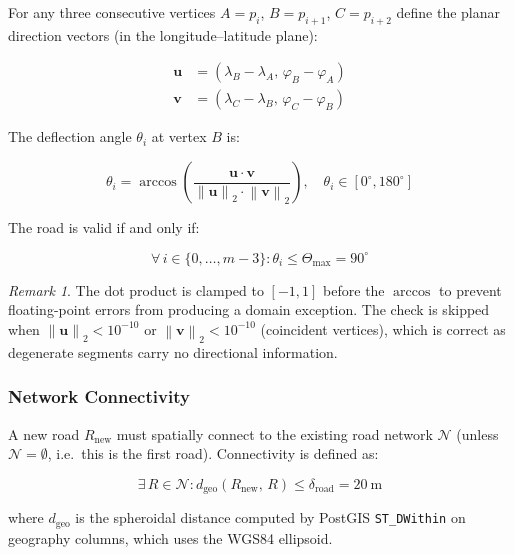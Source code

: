 \documentclass[12pt,a4paper]{article}
\theoremstyle{definition}
\theoremstyle{plain}
\theoremstyle{remark}
\newtheorem{remark}{Remark}[section]
\newcommand{\norm}[1]{\left\lVert #1 \right\rVert}
\newcommand{\vect}[1]{\mathbf{#1}}
\newcommand{\coord}[2]{(#1,\,#2)}
\begin{document}
For any three consecutive vertices $A = p_i$, $B = p_{i+1}$, $C = p_{i+2}$
define the planar direction vectors (in the longitude--latitude plane):

\begin{align}
  \vect{u} &= \coord{\lambda_B - \lambda_A}{\varphi_B - \varphi_A} \\
  \vect{v} &= \coord{\lambda_C - \lambda_B}{\varphi_C - \varphi_B}
\end{align}

The deflection angle $\theta_i$ at vertex $B$ is:

\begin{equation}
  \theta_i = \arccos\!\left(
    \frac{\vect{u} \cdot \vect{v}}{\norm{\vect{u}}_2 \cdot \norm{\vect{v}}_2}
  \right), \quad
  \theta_i \in [0^\circ, 180^\circ]
  \label{eq:road_angle}
\end{equation}

The road is valid if and only if:

\begin{equation}
  \forall\, i \in \{0, \ldots, m-3\}:
  \theta_i \leq \Theta_{\max} = 90^\circ
  \label{eq:road_angle_predicate}
\end{equation}

\begin{remark}
The dot product is clamped to $[-1, 1]$ before the $\arccos$ to prevent
floating-point errors from producing a domain exception. The check is
skipped when $\norm{\vect{u}}_2 < 10^{-10}$ or $\norm{\vect{v}}_2 < 10^{-10}$
(coincident vertices), which is correct as degenerate segments carry no
directional information.
\end{remark}

\subsubsection{Network Connectivity}

A new road $R_{\text{new}}$ must spatially connect to the existing road
network $\mathcal{N}$ (unless $\mathcal{N} = \emptyset$, i.e.\ this is the
first road). Connectivity is defined as:

\begin{equation}
  \exists\, R \in \mathcal{N}:
  d_{\text{geo}}\!\left(R_{\text{new}},\, R\right) \leq \delta_{\text{road}} = 20\ \mathrm{m}
  \label{eq:road_connectivity}
\end{equation}

where $d_{\text{geo}}$ is the spheroidal distance computed by PostGIS
\texttt{ST\_DWithin} on geography columns, which uses the WGS84 ellipsoid.
\end{document}
